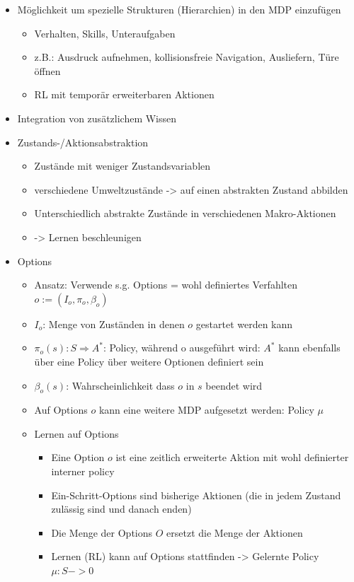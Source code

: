 \documentclass[paper=a4, fontsize=11pt]{scrartcl} %
\numberwithin{equation}{section} %
\numberwithin{figure}{section} %
\numberwithin{table}{section} %
\begin{document}
\begin{itemize}
\item Möglichkeit um spezielle Strukturen (Hierarchien) in den MDP einzufügen
\begin{itemize}
\item Verhalten, Skills, Unteraufgaben
\item z.B.: Ausdruck aufnehmen, kollisionsfreie Navigation, Ausliefern, Türe öffnen
\item RL mit temporär erweiterbaren Aktionen
\end{itemize}
\item Integration von zusätzlichem Wissen
\item Zustands-/Aktionsabstraktion
\begin{itemize}
\item Zustände mit weniger Zustandsvariablen
\item verschiedene Umweltzustände -> auf einen abstrakten Zustand abbilden
\item Unterschiedlich abstrakte Zustände in verschiedenen Makro-Aktionen
\item -> Lernen beschleunigen
\end{itemize}
\item Options
\begin{itemize}
\item Ansatz: Verwende s.g. Options = wohl definiertes Verfahlten $o := (I_o, \pi_o, \beta_o)$
\item $I_o$: Menge von Zuständen in denen $o$ gestartet werden kann
\item $\pi_o(s): S \Rightarrow A^*$: Policy, während o ausgeführt wird: $A^*$ kann ebenfalls über eine Policy über weitere Optionen definiert sein
\item $\beta_o(s)$: Wahrscheinlichkeit dass $o$ in $s$ beendet wird
\item Auf Options $o$ kann eine weitere MDP aufgesetzt werden: Policy $\mu$
\item Lernen auf Options
\begin{itemize}
\item Eine Option $o$ ist eine zeitlich erweiterte Aktion mit wohl definierter interner policy
\item Ein-Schritt-Options sind bisherige Aktionen (die in jedem Zustand zulässig sind und danach enden)
\item Die Menge der Options $O$ ersetzt die Menge der Aktionen
\item Lernen (RL) kann auf Options stattfinden -> Gelernte Policy $\mu:S -> 0$

\end{itemize}
\end{itemize}
\end{itemize}
\end{document}
